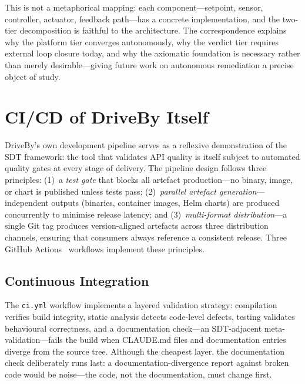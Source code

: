 This is not a metaphorical mapping: each component---setpoint, sensor, controller, actuator, feedback path---has a concrete implementation, and the two-tier decomposition is faithful to the architecture. The correspondence explains why the platform tier converges autonomously, why the verdict tier requires external loop closure today, and why the axiomatic foundation is necessary rather than merely desirable---giving future work on autonomous remediation a precise object of study.

\section{CI/CD of DriveBy Itself}
\label{sec:cicd-driveby}

DriveBy's own development pipeline serves as a reflexive demonstration of the SDT framework: the tool that validates API quality is itself subject to automated quality gates at every stage of delivery. The pipeline design follows three principles: (1)~a \textit{test gate} that blocks all artefact production---no binary, image, or chart is published unless tests pass; (2)~\textit{parallel artefact generation}---independent outputs (binaries, container images, Helm charts) are produced concurrently to minimise release latency; and (3)~\textit{multi-format distribution}---a single Git tag produces version-aligned artefacts across three distribution channels, ensuring that consumers always reference a consistent release. Three GitHub Actions~\cite{github-actions} workflows implement these principles.

\subsection{Continuous Integration}
\label{subsec:ci-pipeline}

The \texttt{ci.yml} workflow implements a layered validation strategy: compilation verifies build integrity, static analysis detects code-level defects, testing validates behavioural correctness, and a documentation check---an SDT-adjacent meta-validation---fails the build when CLAUDE.md files and documentation entries diverge from the source tree. Although the cheapest layer, the documentation check deliberately runs last: a documentation-divergence report against broken code would be noise---the code, not the documentation, must change first.

